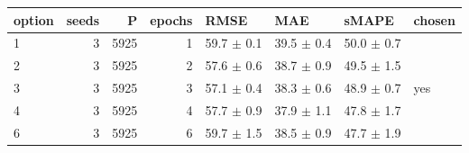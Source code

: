 \begin{tabular}{lrrrllll}
\toprule
option & seeds & P & epochs & RMSE & MAE & sMAPE & chosen \\
\midrule
1 & 3 & 5925 & 1 & 59.7 $\pm$ 0.1 & 39.5 $\pm$ 0.4 & 50.0 $\pm$ 0.7 &  \\
2 & 3 & 5925 & 2 & 57.6 $\pm$ 0.6 & 38.7 $\pm$ 0.9 & 49.5 $\pm$ 1.5 &  \\
3 & 3 & 5925 & 3 & 57.1 $\pm$ 0.4 & 38.3 $\pm$ 0.6 & 48.9 $\pm$ 0.7 & yes \\
4 & 3 & 5925 & 4 & 57.7 $\pm$ 0.9 & 37.9 $\pm$ 1.1 & 47.8 $\pm$ 1.7 &  \\
6 & 3 & 5925 & 6 & 59.7 $\pm$ 1.5 & 38.5 $\pm$ 0.9 & 47.7 $\pm$ 1.9 &  \\
\bottomrule
\end{tabular}
